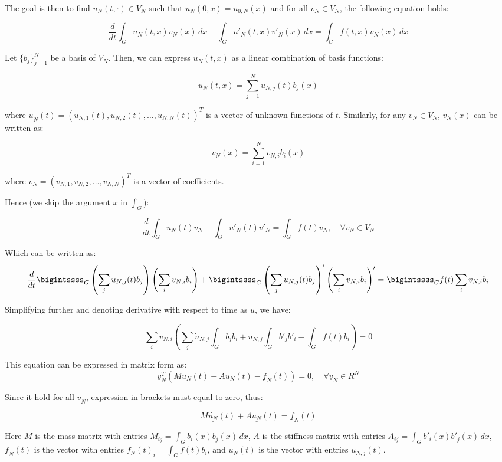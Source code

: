 The goal is then to find \(u_N(t, \cdot) \in V_N\) such that \(u_N(0, x) = u_{0,N}(x)\) and for all \(v_N \in V_N\), the following equation holds:

\[
\frac{{d}}{{dt}}\int_G u_N(t, x)v_N(x)\, dx + \int_G u'_{N}(t, x) v'_{N}(x)\, dx = \int_G f(t, x) v_N(x)\, dx
\]

Let \(\{b_j\}_{j=1}^N\) be a basis of \(V_N\). Then, we can express \(u_N(t, x)\) as a linear combination of basis functions:

\[
u_N(t, x) = \sum_{j=1}^N u_{N,j}(t)b_j(x)
\]

where \(\underline{u}_N(t) = (u_{N,1}(t), u_{N,2}(t), \ldots, u_{N,N}(t))^T\) is a vector of unknown functions of \(t\). Similarly, for any \(v_N \in V_N\), \(v_N(x)\) can be written as:

\[
v_N(x) = \sum_{i=1}^N v_{N,i}b_i(x)
\]

where \(v_N = (v_{N,1}, v_{N,2}, \ldots, v_{N,N})^T\) is a vector of coefficients.


Hence (we skip the argument \(x\) in \(\int_G\)):

\[
\frac{{d}}{{dt}}\int_G u_N(t)v_N + \int_G u'_{N}(t) v'_{N} = \int_G f(t)v_N, \quad \forall v_N \in V_N
\]

Which can be written as:
\[
\frac{{d}}{{dt}} \bigintssss_G \left(\sum_{j} u_{N,j}(t)b_j \right) \left( \sum_{i} v_{N,i}b_i \right) + \bigintssss_G \left( \sum_{j} u_{N,j}(t)b_{j} \right)' \left( \sum_{i} v_{N,i}b_{i} \right)' = \bigintssss_G f(t) \sum_{i} v_{N,i} b_i
\]

Simplifying further and denoting derivative with respect to time as $\dot{u}$, we have:

\[
\sum_{i} v_{N,i}\left(\sum_{j} \dot{u}_{N,j} \int_G b_j b_i + u_{N,j} \int_G b'_{j} b'_{i} - \int_G f(t) b_i\right) = 0
\]

This equation can be expressed in matrix form as:
\[
\underline{v}_N^T\left(M \underline{\dot{u_N}}(t) + A \underline{u_N} (t) - \underline{f}_N(t)\right) = 0, \quad \forall \underline{v}_N \in R^N
\]

Since it hold for all $\underline{v}_N$, expression in brackets must equal to zero, thus:

\[
M \underline{\dot{u_N}}(t) + A \underline{u_N} (t) = \underline{f}_N(t)
\]

Here \(M\) is the mass matrix with entries \(M_{ij} = \int_G b_i(x) b_j(x)\, dx \), \(A\) is the stiffness matrix with entries \(A_{ij} = \int_G b'_i(x) b'_j(x) \, dx\), \(\underline{f}_N(t)\) is the vector with entries \(f_N(t)_i = \int_G f(t)b_i\), and \(u_N(t)\) is the vector with entries \(u_{N,j}(t)\).

